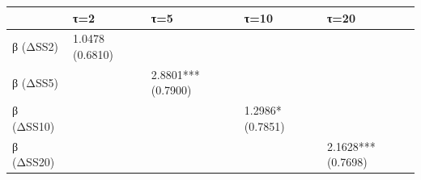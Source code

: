 \begin{tabular}{lllll}
\toprule
 & τ=2 & τ=5 & τ=10 & τ=20 \\
\midrule
β (ΔSS2) & 1.0478
(0.6810) &  &  &  \\
β (ΔSS5) &  & 2.8801***
(0.7900) &  &  \\
β (ΔSS10) &  &  & 1.2986*
(0.7851) &  \\
β (ΔSS20) &  &  &  & 2.1628***
(0.7698) \\
\bottomrule
\end{tabular}
